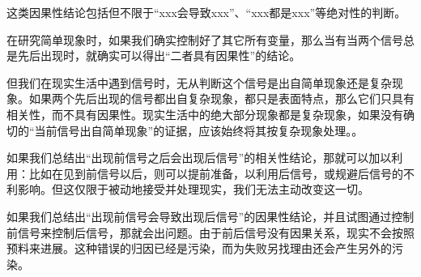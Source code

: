 \begin{explain}
这类因果性结论包括但不限于“xxx会导致xxx”、“xxx都是xxx”等绝对性的判断。

在研究简单现象时，如果我们确实控制好了其它所有变量，那么当有当两个信号总是先后出现时，就确实可以得出“二者具有因果性”的结论。

但我们在现实生活中遇到信号时，无从判断这个信号是出自简单现象还是复杂现象。如果两个先后出现的信号都出自复杂现象，都只是表面特点，那么它们只具有相关性，而不具有因果性。现实生活中的绝大部分现象都是复杂现象，如果没有确切的“当前信号出自简单现象”的证据，应该始终将其按复杂现象处理。。

如果我们总结出“出现前信号之后会出现后信号”的相关性结论，那就可以加以利用：比如在见到前信号以后，则可以提前准备，以利用后信号，或规避后信号的不利影响。但这仅限于被动地接受并处理现实，我们无法主动改变这一切。

如果我们总结出“出现前信号会导致出现后信号”的因果性结论，并且试图通过控制前信号来控制后信号，那就会出问题。由于前后信号没有因果关系，现实不会按照预料来进展。这种错误的归因已经是污染，而为失败另找理由还会产生另外的污染。
\end{explain}

